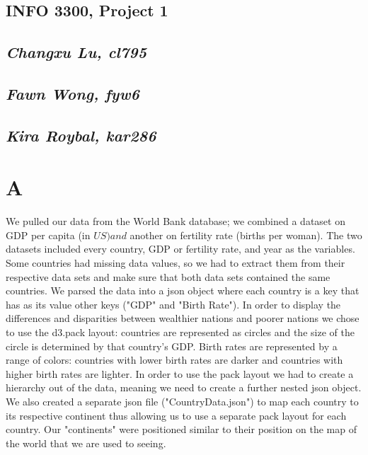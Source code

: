 \documentclass[12pt]{article}
\begin{document}
\begin{center}
\section*{INFO 3300, Project 1}
\subsection*{\textit{Changxu Lu, cl795}}
\subsection*{\textit{Fawn Wong, fyw6}}
\subsection*{\textit{Kira Roybal, kar286}}
\end{center}

\section*{A}
We pulled our data from the World Bank database; we combined a dataset on GDP per capita (in $US) and
 $ 
another on fertility rate (births per woman). The two datasets included every country, GDP or fertility
rate, and year as the variables. Some countries had missing data values, so we had to extract them from
their respective data sets and make sure that both data sets contained the same countries. We parsed the
data into a json object where each country is a key that has as its value other keys ("GDP" and "Birth
Rate"). In order to display the differences and disparities between wealthier nations and poorer nations
we chose to use the d3.pack layout: countries are represented as circles and the size of the circle is
determined by that country's GDP. Birth rates are represented by a range of colors: countries with lower
birth rates are darker and countries with higher birth rates are lighter. In order to use the pack
layout we had to create a hierarchy out of the data, meaning we need to create a further nested json
object. We also created a separate json file ("CountryData.json") to map each country to its respective
continent thus allowing us to use a separate pack layout for each country. Our "continents" were positioned similar to their position on the map of the world that we are used to seeing.
\end{document}
